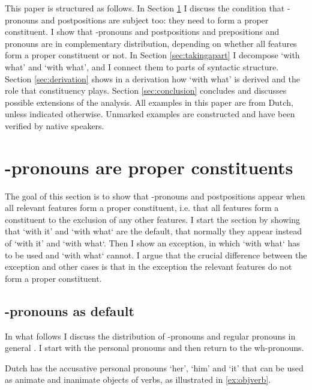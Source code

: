 \documentclass[12pt]{article}
\begin{document}
This paper is structured as follows. In Section \ref{sec:distribution} I discuss the condition that -pronouns and postpositions are subject too: they need to form a proper constituent. I show that -pronouns and postpositions and prepositions and pronouns are in complementary distribution, depending on whether all features form a proper constituent or not.
In Section \ref{sec:takingapart} I decompose  `with what' and  `with what', and I connect them to parts of syntactic structure. Section \ref{sec:derivation} shows in a derivation how  `with what' is derived and the role that constituency plays. Section \ref{sec:conclusion} concludes and discusses possible extensions of the analysis. All examples in this paper are from Dutch, unless indicated otherwise. Unmarked examples are constructed and have been verified by native speakers.


\section{-pronouns are proper constituents}\label{sec:distribution}

The goal of this section is to show that -pronouns and postpositions appear when all relevant features form a proper constituent, i.e. that all features form a constituent to the exclusion of any other features. I start the section by showing that  `with it' and  `with what` are the default, that normally they appear instead of  `with it' and  `with what`. Then I show an exception, in which  `with what` has to be used and  `with what` cannot. I argue that the crucial difference between the exception and other cases is that in the exception the relevant features do not form a proper constituent.


\subsection{-pronouns as default}\label{sec:rdefault}

In what follows I discuss the distribution of -pronouns and regular pronouns in general \citep{riemsdijk1978,koopman1994}. I start with the personal pronouns and then return to the wh-pronouns.

Dutch has the accusative personal pronouns  `her',  `him' and  `it' that can be used as animate and inanimate objects of verbs, as illustrated in \ref{ex:objverb}.
\end{document}
